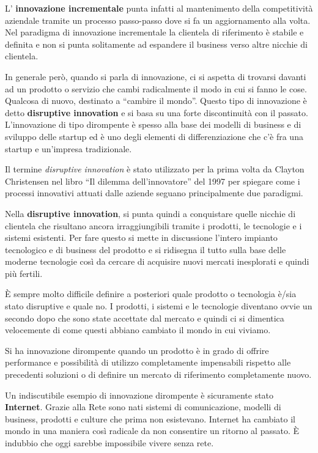 L' \textbf{innovazione incrementale} punta infatti al mantenimento della competitività aziendale tramite un processo passo-passo dove si fa un aggiornamento alla volta. Nel paradigma di innovazione incrementale la clientela di riferimento è stabile e definita e non si punta solitamente ad espandere il business verso altre nicchie di clientela.

In generale però, quando si parla di innovazione, ci si aspetta di trovarsi davanti ad un prodotto o servizio che cambi radicalmente il modo in cui si fanno le cose. Qualcosa di nuovo, destinato a ``cambire il mondo''. Questo tipo di innovazione è detto \textbf{disruptive innovation} e si basa su una forte discontinuità con il passato. L'innovazione di tipo dirompente è spesso alla base dei modelli di business e di sviluppo delle startup ed è uno degli elementi di differenziazione che c'è fra una startup e un'impresa tradizionale.

Il termine \textit{disruptive innovation} è stato utilizzato per la prima volta da Clayton Christensen nel libro ``Il dilemma dell’innovatore'' del 1997 per spiegare come i processi innovativi attuati dalle aziende seguano principalmente due paradigmi.

Nella \textbf{disruptive innovation}, si punta quindi a conquistare quelle nicchie di clientela che risultano ancora irraggiungibili tramite i prodotti, le tecnologie e i sistemi esistenti. Per fare questo si mette in discussione l'intero impianto tecnologico e di business del prodotto e si ridisegna il tutto sulla base delle moderne tecnologie così da cercare di acquisire nuovi mercati inesplorati e quindi più fertili.

È sempre molto difficile definire a posteriori quale prodotto o tecnologia è/sia stato disruptive e quale no. I prodotti, i sistemi e le tecnologie diventano ovvie un secondo dopo che sono state accettate dal mercato e quindi ci si dimentica velocemente di come questi abbiano cambiato il mondo in cui viviamo. 

Si ha innovazione dirompente quando un prodotto è in grado di offrire performance e possibilità di utilizzo completamente impensabili rispetto alle precedenti soluzioni o di definire un mercato di riferimento completamente nuovo.

Un indiscutibile esempio di innovazione dirompente è sicuramente stato \textbf{Internet}. Grazie alla Rete sono nati sistemi di comunicazione, modelli di business, prodotti e culture che prima non esistevano. Internet ha cambiato il mondo in una maniera così radicale da non consentire un ritorno al passato. È indubbio che oggi sarebbe impossibile vivere senza rete.

